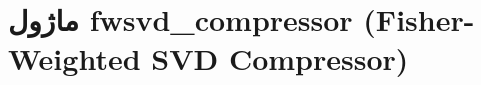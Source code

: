 \section{ماژول fwsvd\_compressor (Fisher-Weighted SVD Compressor)}
\label{sec:module_fwsvd_compressor}
